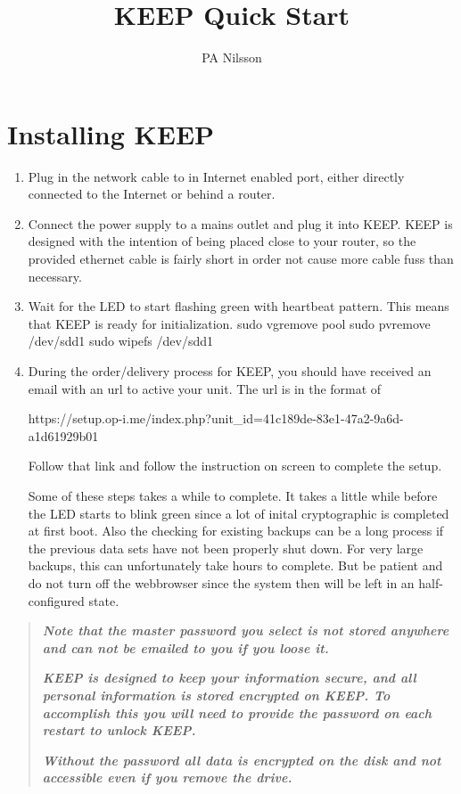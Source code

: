 \documentclass[12pt,a4paper,titlepage]{article}
\author{PA Nilsson}
\title{KEEP Quick Start}
\begin{document}
\FloatBarrier
\section{Installing KEEP}
	\begin{enumerate}

		\item Plug in the network cable to in Internet enabled port, either directly connected to the Internet or behind a router.

		\item Connect the power supply to a mains outlet and plug it into KEEP. KEEP is designed with the intention of being placed close to your router, so the provided ethernet cable is fairly short in order not cause more cable fuss than necessary.

		\item Wait for the LED to start flashing green with heartbeat pattern. This means that KEEP is ready for initialization.
sudo vgremove pool
sudo pvremove /dev/sdd1
sudo wipefs /dev/sdd1

		\item During the order/delivery process for KEEP, you should have received an email with an url to active your unit. The url is in the format of

\begin{small}
https://setup.op-i.me/index.php?unit\_id=41c189de-83e1-47a2-9a6d-a1d61929b01
\end{small}

Follow that link and follow the instruction on screen to complete the setup.

Some of these steps takes a while to complete. It takes a little while before the LED starts to blink green since a lot of inital cryptographic is completed at first boot. Also the checking for existing backups can be a long process if the previous data sets have not been properly shut down. For very large backups, this can unfortunately take hours to complete. But be patient and do not turn off the webbrowser since the system then will be left in an half-configured state.

\end{enumerate}
\begin{quote}
\emph{\textbf{
Note that the master password you select is not stored anywhere and can not be emailed to you if you loose it.
}}

\emph{\textbf{
KEEP is designed to keep your information secure, and all personal information is stored encrypted on KEEP. To accomplish this you will need to provide the password on each restart to unlock KEEP.}}

\emph{\textbf{ Without the password all data is encrypted on the disk and not accessible even if you remove the drive.
}}
\end{quote}


\FloatBarrier
\end{document}
